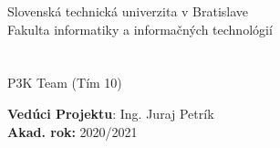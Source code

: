 \newcommand{\fiitmark}{%
\large
\textnormal{%
Slovenská technická univerzita v Bratislave \\
\vspace*{.25cm}
Fakulta informatiky a informačných technológií} \\
}

\begin{titlepage}
        \begin{center}
            \vspace*{.5cm}
            \fiitmark

            \vfill
            \huge
            \textbf{\documenttitle} \\

            \vspace*{.25cm}
            \large
            \textbf{\documentsubtitle} \\

            \vspace*{.25cm}
            \textnormal{P3K Team (Tím 10)} \\

        \end{center}

        \vfill

        \begin{flushleft}
            \textbf{Vedúci Projektu}: Ing. Juraj Petrík \\
            \textbf{Akad. rok:} 2020/2021
        \end{flushleft}
\end{titlepage}

